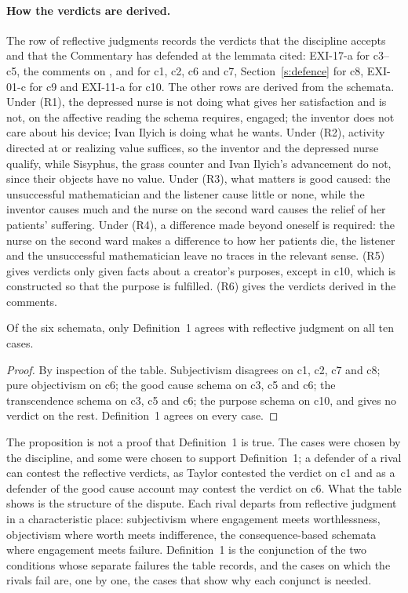 \paragraph{How the verdicts are derived.} The row of reflective judgments records the verdicts that the discipline accepts and that the Commentary has defended at the lemmata cited: EXI-17-a for c3--c5, the comments on ,  and  for c1, c2, c6 and c7, Section~\ref{s:defence} for c8, EXI-01-c for c9 and EXI-11-a for c10. The other rows are derived from the schemata. Under (R1), the depressed nurse is not doing what gives her satisfaction and is not, on the affective reading the schema requires, engaged; the inventor does not care about his device; Ivan Ilyich is doing what he wants. Under (R2), activity directed at or realizing value suffices, so the inventor and the depressed nurse qualify, while Sisyphus, the grass counter and Ivan Ilyich's advancement do not, since their objects have no value. Under (R3), what matters is good caused: the unsuccessful mathematician and the listener cause little or none, while the inventor causes much and the nurse on the second ward causes the relief of her patients' suffering. Under (R4), a difference made beyond oneself is required: the nurse on the second ward makes a difference to how her patients die, the listener and the unsuccessful mathematician leave no traces in the relevant sense. (R5) gives verdicts only given facts about a creator's purposes, except in c10, which is constructed so that the purpose is fulfilled. (R6) gives the verdicts derived in the comments.

\begin{proposition}\label{p:fit}
Of the six schemata, only Definition~1 agrees with reflective judgment on all ten cases.
\end{proposition}

\begin{proof}
By inspection of the table. Subjectivism disagrees on c1, c2, c7 and c8; pure objectivism on c6; the good cause schema on c3, c5 and c6; the transcendence schema on c3, c5 and c6; the purpose schema on c10, and gives no verdict on the rest. Definition~1 agrees on every case.
\end{proof}

The proposition is not a proof that Definition~1 is true. The cases were chosen by the discipline, and some were chosen to support Definition~1; a defender of a rival can contest the reflective verdicts, as Taylor contested the verdict on c1 and as a defender of the good cause account may contest the verdict on c6. What the table shows is the structure of the dispute. Each rival departs from reflective judgment in a characteristic place: subjectivism where engagement meets worthlessness, objectivism where worth meets indifference, the consequence-based schemata where engagement meets failure. Definition~1 is the conjunction of the two conditions whose separate failures the table records, and the cases on which the rivals fail are, one by one, the cases that show why each conjunct is needed.

